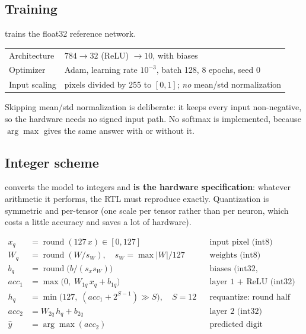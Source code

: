 \documentclass[11pt]{article}
\begin{document}
\subsection{Training}
 trains the float32 reference network.

\begin{center}
\begin{tabular}{@{}ll@{}}
\toprule
Architecture  & $784 \rightarrow 32$ (ReLU) $\rightarrow 10$, with biases \\
Optimizer     & Adam, learning rate $10^{-3}$, batch 128, 8 epochs, seed 0 \\
Input scaling & pixels divided by 255 to $[0,1]$; \emph{no} mean/std normalization \\
\bottomrule
\end{tabular}
\end{center}

Skipping mean/std normalization is deliberate: it keeps every input
non-negative, so the hardware needs no signed input path. No softmax is
implemented, because $\arg\max$ gives the same answer with or without it.

\subsection{Integer scheme}
 converts the model to integers and \textbf{is the
hardware specification}: whatever arithmetic it performs, the RTL must reproduce
exactly. Quantization is symmetric and per-tensor (one scale per tensor rather
than per neuron, which costs a little accuracy and saves a lot of hardware).

\begin{align*}
x_q &= \operatorname{round}(127\,x) \in [0, 127]
  && \text{input pixel (int8)}\\
W_q &= \operatorname{round}(W / s_W),\quad s_W = \max|W| / 127
  && \text{weights (int8)}\\
b_q &= \operatorname{round}\!\big(b / (s_x s_W)\big)
  && \text{biases (int32, accumulator scale)}\\[0.4em]
\mathit{acc}_1 &= \max\!\big(0,\; W_{1q}\,x_q + b_{1q}\big)
  && \text{layer 1 + ReLU (int32)}\\
h_q &= \min\!\big(127,\; (\mathit{acc}_1 + 2^{S-1}) \gg S\big),\quad S = 12
  && \text{requantize: round half up, clamp}\\
\mathit{acc}_2 &= W_{2q}\,h_q + b_{2q}
  && \text{layer 2 (int32)}\\
\hat{y} &= \arg\max(\mathit{acc}_2)
  && \text{predicted digit}
\end{align*}
\end{document}
